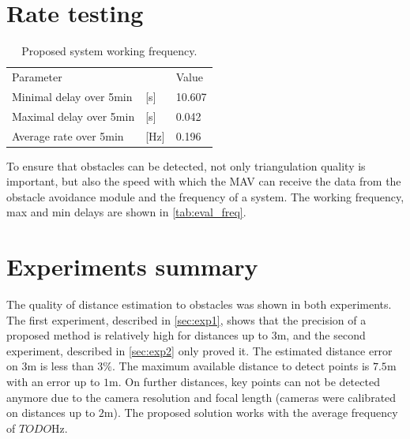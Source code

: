 \section{Rate testing}
\begin{table}[ht]
    \begin{center}
      \begin{tabular}{lll}
      \hline
        Parameter & & Value \\
        Minimal delay over 5min & [s]  & 10.607 \\
        Maximal delay over 5min & [s]  & 0.042 \\
        Average rate over 5min  & [Hz] & 0.196 \\ 
      \end{tabular}
    \end{center}
    \caption{Proposed system working frequency.}
    \label{tab:eval_freq}
\end{table}

To ensure that obstacles can be detected, not only triangulation quality is important, but also the speed with which the MAV can receive the data from the obstacle avoidance module and the frequency of a system.
The working frequency, max and min delays are shown in \autoref{tab:eval_freq}.
 
\section{Experiments summary}
The quality of distance estimation to obstacles was shown in both experiments.
The first experiment, described in \autoref{sec:exp1}, shows that the precision of a proposed method is relatively high for distances up to 3m, and the second experiment, described in \autoref{sec:exp2} only proved it. 
The estimated distance error on $3$m is less than $3\%$.
The maximum available distance to detect points is $7.5$m with an error up to $1$m.
On further distances, key points can not be detected anymore due to the camera resolution and focal length (cameras were calibrated on distances up to $2$m).
The proposed solution works with the average frequency of $TODO$Hz.
